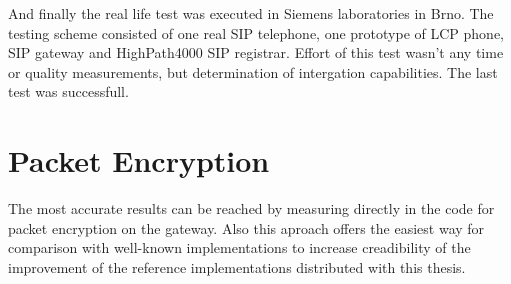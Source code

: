 And finally the real life test was executed in Siemens laboratories in Brno.
The testing scheme consisted of one real SIP telephone, one prototype of LCP 
phone, SIP gateway and HighPath4000 SIP registrar. Effort of this test wasn't
any time or quality measurements, but determination of intergation capabilities.
The last test was successfull.
   

\section{Packet Encryption}\label{enc_comp}
The most accurate results can be reached by measuring directly in the code for
packet encryption on the gateway. Also this aproach offers the easiest way
for comparison with well-known implementations to increase creadibility of 
the improvement of the reference implementations distributed with this thesis. 

